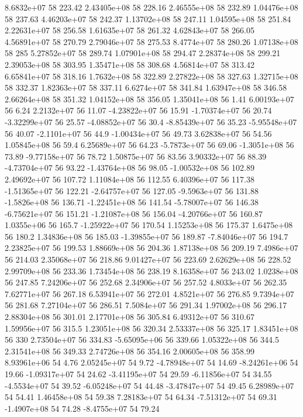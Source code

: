 8.6832e+07 58 223.42
2.43405e+08 58 228.16
2.46555e+08 58 232.89
1.04476e+08 58 237.63
4.46203e+07 58 242.37
1.13702e+08 58 247.11
1.04595e+08 58 251.84
2.22631e+07 58 256.58
1.61635e+07 58 261.32
4.62843e+07 58 266.05
4.56891e+07 58 270.79
2.79046e+07 58 275.53
8.4774e+07 58 280.26
1.07138e+08 58 285
5.27852e+07 58 289.74
1.07901e+08 58 294.47
2.28374e+08 58 299.21
2.39053e+08 58 303.95
1.35471e+08 58 308.68
4.56814e+07 58 313.42
6.65841e+07 58 318.16
1.7632e+08 58 322.89
2.27822e+08 58 327.63
1.32715e+08 58 332.37
1.82363e+07 58 337.11
6.6274e+07 58 341.84
1.63947e+08 58 346.58
2.66264e+08 58 351.32
1.04152e+08 58 356.05
1.35041e+08 56 1.41
6.00193e+07 56 6.24
2.2132e+07 56 11.07
-4.23822e+07 56 15.91
-1.70374e+07 56 20.74
-3.32299e+07 56 25.57
-4.08852e+07 56 30.4
-8.85439e+07 56 35.23
-5.95548e+07 56 40.07
-2.1101e+07 56 44.9
-1.00434e+07 56 49.73
3.62838e+07 56 54.56
1.05845e+08 56 59.4
6.25689e+07 56 64.23
-5.7873e+07 56 69.06
-1.3051e+08 56 73.89
-9.77158e+07 56 78.72
1.50875e+07 56 83.56
3.90332e+07 56 88.39
-4.73704e+07 56 93.22
-1.43764e+08 56 98.05
-1.00532e+08 56 102.89
2.49692e+07 56 107.72
1.11084e+08 56 112.55
6.40396e+07 56 117.38
-1.51365e+07 56 122.21
-2.64757e+07 56 127.05
-9.5963e+07 56 131.88
-1.5826e+08 56 136.71
-1.22451e+08 56 141.54
-5.78007e+07 56 146.38
-6.75621e+07 56 151.21
-1.21087e+08 56 156.04
-4.20766e+07 56 160.87
1.0355e+06 56 165.7
-1.25922e+07 56 170.54
1.15253e+08 56 175.37
1.6475e+08 56 180.2
1.34836e+08 56 185.03
-1.39855e+07 56 189.87
-7.84046e+07 56 194.7
2.23825e+07 56 199.53
1.88669e+08 56 204.36
1.87138e+08 56 209.19
7.4986e+07 56 214.03
2.35068e+07 56 218.86
9.01427e+07 56 223.69
2.62629e+08 56 228.52
2.99709e+08 56 233.36
1.73454e+08 56 238.19
8.16358e+07 56 243.02
1.0238e+08 56 247.85
7.24206e+07 56 252.68
2.34906e+07 56 257.52
4.8033e+07 56 262.35
7.62771e+07 56 267.18
6.53941e+07 56 272.01
4.8521e+07 56 276.85
9.7394e+07 56 281.68
7.27104e+07 56 286.51
7.5084e+07 56 291.34
1.97002e+08 56 296.17
2.88304e+08 56 301.01
2.17701e+08 56 305.84
6.49312e+07 56 310.67
1.59956e+07 56 315.5
1.23051e+08 56 320.34
2.53337e+08 56 325.17
1.83451e+08 56 330
2.73504e+07 56 334.83
-5.65095e+06 56 339.66
1.05322e+08 56 344.5
2.31541e+08 56 349.33
2.74726e+08 56 354.16
2.00605e+08 56 358.99
8.93961e+06 54 4.76
2.05245e+07 54 9.72
-4.78948e+07 54 14.69
-8.24261e+06 54 19.66
-1.09317e+07 54 24.62
-3.41195e+07 54 29.59
-6.11856e+07 54 34.55
-4.5534e+07 54 39.52
-6.05248e+07 54 44.48
-3.47847e+07 54 49.45
6.28989e+07 54 54.41
1.46458e+08 54 59.38
7.28183e+07 54 64.34
-7.51312e+07 54 69.31
-1.4907e+08 54 74.28
-8.4755e+07 54 79.24
